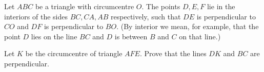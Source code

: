 Let $ABC$ be a triangle with circumcentre $O$. The points $D,E,F$ lie in the interiors of the sides $BC,CA,AB$ respectively, such that $DE$ is perpendicular to $CO$ and $DF$ is perpendicular to $BO$. (By interior we mean, for example, that the point $D$ lies on the line $BC$ and $D$ is between $B$ and $C$ on that line.)

Let $K$ be the circumcentre of triangle $AFE$. Prove that the lines $DK$ and $BC$ are perpendicular.